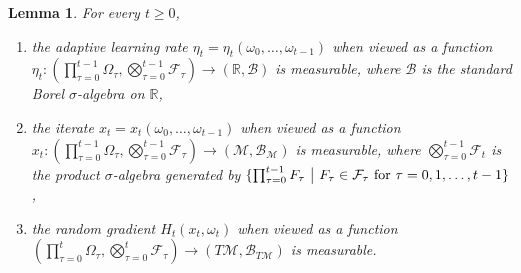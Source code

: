 \documentclass{amsart}
\newcommand{\R}{\mathbb{R}}
\newcommand{\fil}{\mathcal{F}}
\newcommand{\M}{\mathcal{M}}
\newcommand{\B}{\mathcal{B}}
\theoremstyle{plain}
\newtheorem{lemma}[theorem]{Lemma}
\theoremstyle{definition}
\theoremstyle{remark}
\numberwithin{theorem}{section}
\numberwithin{equation}{section}
\begin{document}
\begin{lemma}\label{lemma-measurability-adaptive}
For every $t\geq 0$, 
\begin{enumerate}
	\item the adaptive learning rate $\eta_t=\eta_t(\omega_0,\dots,\omega_{t-1})$ when viewed as a function $\eta_t:(\prod_{\tau =0}^{t-1} \Omega_\tau, \bigotimes_{\tau =0}^{t-1} \fil_\tau) \rightarrow (\R, \B)$ is measurable, where $\B$ is the standard Borel $\sigma$-algebra on $\R$,
	\item the iterate $x_t=x_t(\omega_0,\dots,\omega_{t-1})$ when viewed as a function $x_t:(\prod_{\tau =0}^{t-1} \Omega_\tau, \bigotimes_{\tau =0}^{t-1} \fil_\tau) \rightarrow (\M, \B_{\M})$ is measurable, where $\bigotimes_{\tau =0}^{t-1} \fil_t$ is the product $\sigma$-algebra generated by $\{\prod_{\tau =0}^{t-1} F_\tau ~\big{|}~ F_\tau \in\fil_\tau \text{ for } \tau=0,1,\dots, t-1\}$,
	\item the random gradient $H_t(x_t,\omega_t)$ when viewed as a function $(\prod_{\tau =0}^{t} \Omega_\tau, \bigotimes_{\tau =0}^{t} \fil_\tau) \rightarrow (T\M, \B_{T\M})$ is measurable.
\end{enumerate}
\end{lemma}
\end{document}
